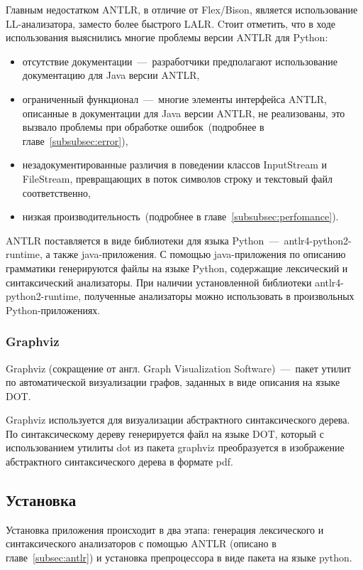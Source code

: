 \documentclass[12pt,a4paper,oneside]{extarticle}
\begin{document}
            Главным недостатком ANTLR, в отличие от Flex/Bison, является использование LL-анализатора, заместо более быстрого LALR.
            Cтоит отметить, что в ходе использования выяснились многие проблемы версии ANTLR для Python:
            \begin{itemize}
                \item отсутствие документации~---~разработчики предполагают использование документацию для Java версии ANTLR,
                \item ограниченный функционал~---~многие элементы интерфейса ANTLR, описанные в документации для Java версии ANTLR, не реализованы, это вызвало проблемы при обработке ошибок~(подробнее в главе~\ref{subsubsec:error}),
                \item незадокументированные различия в поведении классов InputStream и FileStream, превращающих в поток символов строку и текстовый файл соответственно,
                \item низкая производительность~(подробнее в главе~\ref{subsubsec:perfomance}).
            \end{itemize}

            ANTLR поставляется в виде библиотеки для языка Python~---~antlr4-python2-runtime, а также java-приложения.
            С помощью java-приложения по описанию грамматики генерируются файлы на языке Python, содержащие лексический и синтаксический анализаторы.
            При наличии установленной библиотеки antlr4-python2-runtime, полученные анализаторы можно использовать в произвольных Python-приложениях.            
        \subsubsection{Graphviz}
            Graphviz (сокращение от англ. Graph Visualization Software)~---~пакет утилит по автоматической визуализации графов, заданных в виде описания на языке DOT.

            Graphviz используется для визуализации абстрактного синтаксического дерева.
            По синтаксическому дереву генерируется файл на языке DOT, который с использованием утилиты dot из пакета graphviz преобразуется в изображение абстрактного синтаксического дерева в формате pdf.
    \clearpage

    \subsection{Установка}
        Установка приложения происходит в два этапа: генерация лексического и синтаксического анализаторов с помощью ANTLR (описано в главе~\ref{subsec:antlr}) и установка препроцессора в виде пакета на языке python.
        
\end{document}
